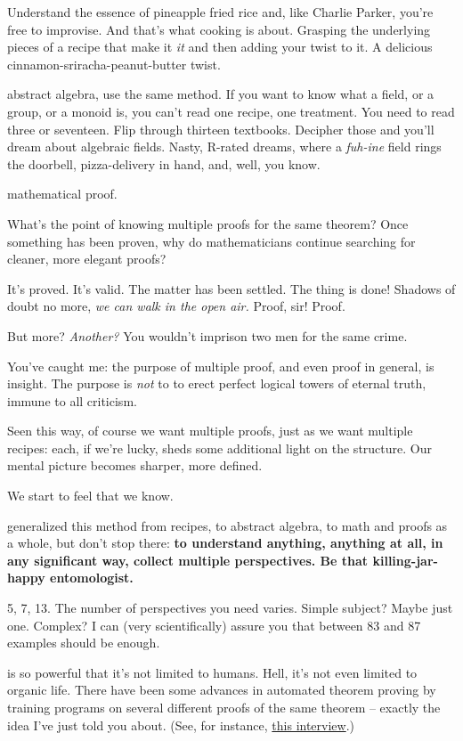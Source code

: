 Understand the essence of pineapple fried rice and, like Charlie Parker, you're free to improvise. And that's what cooking is about. Grasping the underlying pieces of a recipe
that make it \textit{it} and then adding your twist to it. A delicious
cinnamon-sriracha-peanut-butter twist.

 abstract algebra, use the same method. If you want to know what a field,
or a group, or a monoid is, you can't read one recipe, one treatment. You need
to read three or seventeen. Flip through thirteen textbooks. Decipher those and
you'll dream about algebraic fields. Nasty, R-rated dreams, where a
\textit{fuh-ine} field rings the doorbell, pizza-delivery in hand, and, well, you know.

 mathematical proof.

What's the point of knowing multiple proofs for the same theorem? Once something
has been proven, why do mathematicians continue searching for cleaner, more
elegant proofs?

It's proved. It's valid. The matter has been settled. The thing is done! Shadows
of doubt no more, \textit{we can walk in the open air.} Proof, sir! Proof.

But more? \textit{Another?} You wouldn't imprison two men for the same crime.

 You've caught me: the purpose of multiple proof, and even proof in
general, is insight. The purpose is \textit{not} to to erect perfect logical
towers of eternal truth, immune to all criticism.

Seen this way, of course we want multiple proofs, just as we want multiple
recipes: each, if we're lucky, sheds some additional light on the structure. Our mental
picture becomes sharper, more defined.

We start to feel that we know.

 generalized this method from recipes, to abstract algebra, to math and proofs
as a whole, but don't stop there: \textbf{to understand anything, anything at all, in
  any significant way, collect multiple perspectives. Be that killing-jar-happy
  entomologist.}

5, 7, 13. The number of perspectives you need varies. Simple subject? Maybe just
one. Complex? I can (very scientifically) assure you that between 83 and 87
examples should be enough.

 is so powerful that it's not limited to humans. Hell, it's
not even limited to organic life. There have been some advances in
automated theorem proving by training programs on several different proofs of
the same theorem -- exactly the idea I've just told you about. (See, for
instance, \href{http://intelligence.org/2013/12/21/josef-urban-on-machine-learning-and-automated-reasoning/}{this interview}.)



